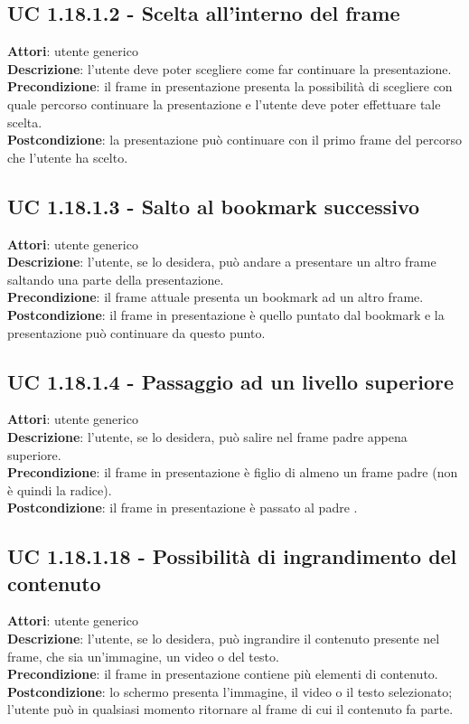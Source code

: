 	\subsection{UC 1.18.1.2 - Scelta all'interno del frame}{
		\label{uc1.18.1.2}
		\textbf{Attori}: utente generico \\
		\textbf{Descrizione}: l'utente deve poter scegliere come far continuare la presentazione. \\
		\textbf{Precondizione}: il frame in presentazione presenta la possibilità di scegliere con quale percorso continuare la presentazione e l'utente deve poter effettuare tale scelta.	\\
		\textbf{Postcondizione}: la presentazione può continuare con il primo frame del percorso che l'utente ha scelto.	\\
	}
	\subsection{UC 1.18.1.3 - Salto al bookmark successivo}{
		\label{uc1.18.1.3}
		\textbf{Attori}: utente generico \\
		\textbf{Descrizione}: l'utente, se lo desidera, può andare a presentare un altro frame saltando una parte della presentazione. \\
		\textbf{Precondizione}: il frame attuale presenta un bookmark ad un altro frame.	\\
		\textbf{Postcondizione}: il frame in presentazione è quello puntato dal bookmark e la presentazione può continuare da questo punto.	\\
	}
	\subsection{UC 1.18.1.4 - Passaggio ad un livello superiore}{
		\label{uc1.18.1.4}
		\textbf{Attori}: utente generico \\
		\textbf{Descrizione}: l'utente, se lo desidera, può salire nel frame padre appena superiore. \\
		\textbf{Precondizione}: il frame in presentazione è figlio di almeno un frame padre (non è quindi la radice).	\\
		\textbf{Postcondizione}: il frame in presentazione è passato al padre .	\\
	}
	\subsection{UC 1.18.1.18 - Possibilità di ingrandimento del contenuto}{
		\label{uc1.18.1.18}
		\textbf{Attori}: utente generico \\
		\textbf{Descrizione}: l'utente, se lo desidera, può ingrandire il contenuto presente nel frame, che sia un'immagine, un video o del testo. \\
		\textbf{Precondizione}: il frame in presentazione contiene più elementi di contenuto.	\\
		\textbf{Postcondizione}: lo schermo presenta l'immagine, il video o il testo selezionato; l'utente può in qualsiasi momento ritornare al frame di cui il contenuto fa parte.	\\
	}
